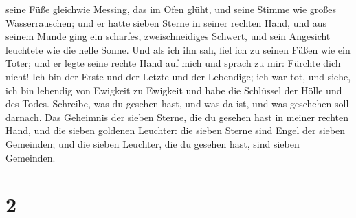 seine Füße gleichwie Messing, das im Ofen glüht, und seine Stimme wie
großes Wasserrauschen;  und er hatte sieben Sterne in
seiner rechten Hand, und aus seinem Munde ging ein scharfes,
zweischneidiges Schwert, und sein Angesicht leuchtete wie die helle
Sonne.  Und als ich ihn sah, fiel ich zu seinen Füßen wie
ein Toter; und er legte seine rechte Hand auf mich und sprach zu mir:
Fürchte dich nicht! Ich bin der Erste und der Letzte  und
der Lebendige; ich war tot, und siehe, ich bin lebendig von Ewigkeit zu
Ewigkeit und habe die Schlüssel der Hölle und des Todes. 
Schreibe, was du gesehen hast, und was da ist, und was geschehen soll
darnach.  Das Geheimnis der sieben Sterne, die du gesehen
hast in meiner rechten Hand, und die sieben goldenen Leuchter: die
sieben Sterne sind Engel der sieben Gemeinden; und die sieben Leuchter,
die du gesehen hast, sind sieben Gemeinden.

\hypertarget{section-1}{%
\section{2}\label{section-1}}

